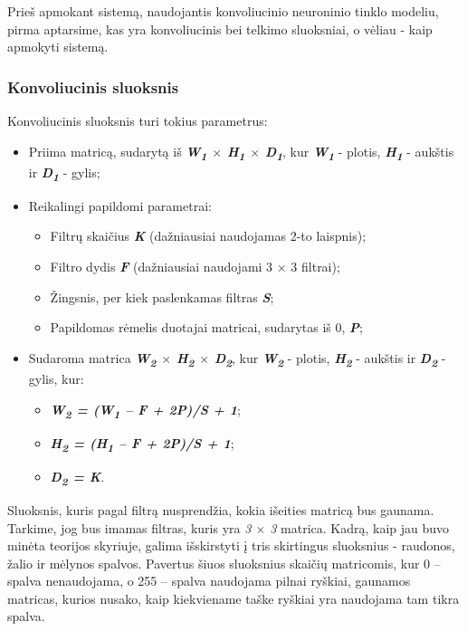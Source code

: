 \documentclass{VUMIFInfKursinis}
\begin{document}
Prieš apmokant sistemą, naudojantis konvoliucinio neuroninio tinklo modeliu, pirma aptarsime, kas yra konvoliucinis bei telkimo sluoksniai, o vėliau - kaip apmokyti sistemą.

\subsubsection{Konvoliucinis sluoksnis}

Konvoliucinis sluoksnis turi tokius parametrus:
\begin{itemize}
	\item Priima matricą, sudarytą iš \textit{\textbf{W\textsubscript{1} $\times$ H\textsubscript{1} $\times$ D\textsubscript{1}}}, kur \textit{\textbf{W\textsubscript{1}}} - plotis, \textit{\textbf{H\textsubscript{1}}} - aukštis ir \textit{\textbf{D\textsubscript{1}}} - gylis;
	\item Reikalingi papildomi parametrai:
		\begin{itemize}
			\item Filtrų skaičius \textbf{\textit{K}} (dažniausiai naudojamas 2-to laispnis);
			\item Filtro dydis \textbf{\textit{F}} (dažniausiai naudojami 3 $\times$ 3 filtrai);
			\item Žingsnis, per kiek paslenkamas filtras \textbf{\textit{S}};
			\item Papildomas rėmelis duotajai matricai, sudarytas iš 0, \textbf{\textit{P}};
		\end{itemize}
	\item Sudaroma matrica \textit{\textbf{W\textsubscript{2} $\times$ H\textsubscript{2} $\times$ D\textsubscript{2}}}, kur \textit{\textbf{W\textsubscript{2}}} - plotis, \textit{\textbf{H\textsubscript{2}}} - aukštis ir \textit{\textbf{D\textsubscript{2}}} - gylis, kur:
		\begin{itemize}
			\item \textit{\textbf{W\textsubscript{2} = (W\textsubscript{1} – F + 2P)/S + 1}};
			\item \textit{\textbf{H\textsubscript{2} = (H\textsubscript{1} – F + 2P)/S + 1}};
			\item \textit{\textbf{D\textsubscript{2} = K}}.
		\end{itemize}
\end{itemize}

Sluoksnis, kuris pagal filtrą nusprendžia, kokia išeities matricą bus gaunama. Tarkime, jog bus imamas filtras, kuris yra \textit{3 $\times$ 3} matrica. Kadrą, kaip jau buvo minėta teorijos skyriuje, galima išskirstyti į tris skirtingus sluoksnius - raudonos, žalio ir mėlynos spalvos. Pavertus šiuos sluoksnius skaičių matricomis, kur 0 – spalva nenaudojama, o 255 – spalva naudojama pilnai ryškiai, gaunamos matricas, kurios nusako, kaip kiekviename taške ryškiai yra naudojama tam tikra spalva.
\end{document}
